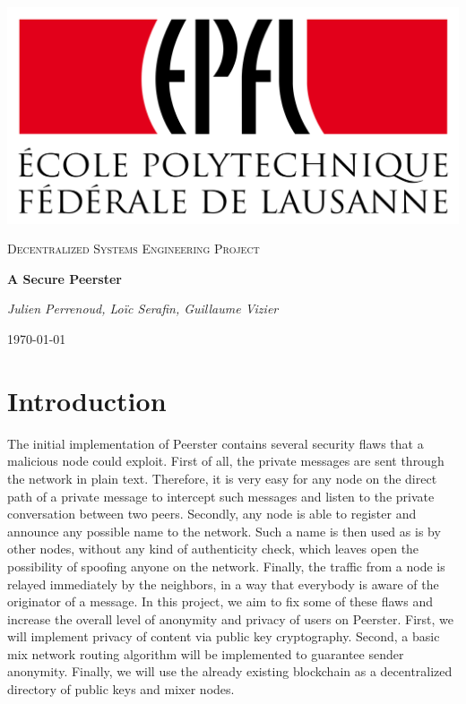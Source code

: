 \documentclass[11pt, a4paper]{article}
\newcommand{\authors}{Julien Perrenoud, Loïc Serafin, Guillaume Vizier}
\renewcommand{\title}{A Secure Peerster}
\begin{document}
\begin{titlepage}
	\centering
	\includegraphics[scale=0.1]{epfl.png} \par
	\vspace{1.5cm}

	{\scshape\Large Decentralized Systems Engineering Project\par}
	\vspace{1.5cm}
	{\huge\bfseries \title \par}
	\vspace{2cm}
	{\Large\itshape \authors \par}
	\vfill
	\vfill

	{\large \today \par}

\end{titlepage}

\tableofcontents

\newpage

\section{Introduction}

    The initial implementation of Peerster contains several security flaws that a malicious node could exploit.
    First of all, the private messages are sent through the network in plain text.
    Therefore, it is very easy for any node on the direct path of a private message to intercept such messages and listen to the private conversation between two peers.
    Secondly, any node is able to register and announce any possible name to the network.
    Such a name is then used as is by other nodes, without any kind of authenticity check, which leaves open the possibility of spoofing anyone on the network.
    Finally, the traffic from a node is relayed immediately by the neighbors, in a way that everybody is aware of the originator of a message.
    In this project, we aim to fix some of these flaws and increase the overall level of anonymity and privacy of users on Peerster.
    First, we will implement privacy of content via public key cryptography.
    Second, a basic mix network routing algorithm will be implemented to guarantee sender anonymity.
    Finally, we will use the already existing blockchain as a decentralized directory of public keys and mixer nodes.
\end{document}
